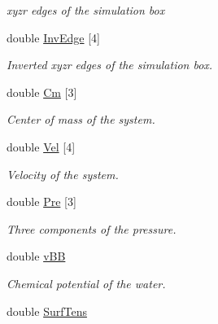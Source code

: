 \begin{DoxyCompactItemize}
\begin{DoxyCompactList}\small\item\em xyzr edges of the simulation box \end{DoxyCompactList}\item 
\hypertarget{structGENERAL_aabbbbadc73659c7ef925b55cf4dd6aeb}{double \hyperlink{structGENERAL_aabbbbadc73659c7ef925b55cf4dd6aeb}{\-Inv\-Edge} \mbox{[}4\mbox{]}}\label{structGENERAL_aabbbbadc73659c7ef925b55cf4dd6aeb}

\begin{DoxyCompactList}\small\item\em \-Inverted xyzr edges of the simulation box. \end{DoxyCompactList}\item 
\hypertarget{structGENERAL_a7125116c90bd17b7d8d083e0e6771cb6}{double \hyperlink{structGENERAL_a7125116c90bd17b7d8d083e0e6771cb6}{\-Cm} \mbox{[}3\mbox{]}}\label{structGENERAL_a7125116c90bd17b7d8d083e0e6771cb6}

\begin{DoxyCompactList}\small\item\em \-Center of mass of the system. \end{DoxyCompactList}\item 
\hypertarget{structGENERAL_afd1b3747170c238c06ba3420cbc5c2a2}{double \hyperlink{structGENERAL_afd1b3747170c238c06ba3420cbc5c2a2}{\-Vel} \mbox{[}4\mbox{]}}\label{structGENERAL_afd1b3747170c238c06ba3420cbc5c2a2}

\begin{DoxyCompactList}\small\item\em \-Velocity of the system. \end{DoxyCompactList}\item 
\hypertarget{structGENERAL_a1c5ab9214cb52a6c7be112e52fb3a0ec}{double \hyperlink{structGENERAL_a1c5ab9214cb52a6c7be112e52fb3a0ec}{\-Pre} \mbox{[}3\mbox{]}}\label{structGENERAL_a1c5ab9214cb52a6c7be112e52fb3a0ec}

\begin{DoxyCompactList}\small\item\em \-Three components of the pressure. \end{DoxyCompactList}\item 
\hypertarget{structGENERAL_a1f1783fb13c526c8a43fac88be809a61}{double \hyperlink{structGENERAL_a1f1783fb13c526c8a43fac88be809a61}{v\-B\-B}}\label{structGENERAL_a1f1783fb13c526c8a43fac88be809a61}

\begin{DoxyCompactList}\small\item\em \-Chemical potential of the water. \end{DoxyCompactList}\item 
\hypertarget{structGENERAL_a118a5bd5025a170e18a8ec882f7292cf}{double \hyperlink{structGENERAL_a118a5bd5025a170e18a8ec882f7292cf}{\-Surf\-Tens}}\label{structGENERAL_a118a5bd5025a170e18a8ec882f7292cf}


\end{DoxyCompactItemize}
